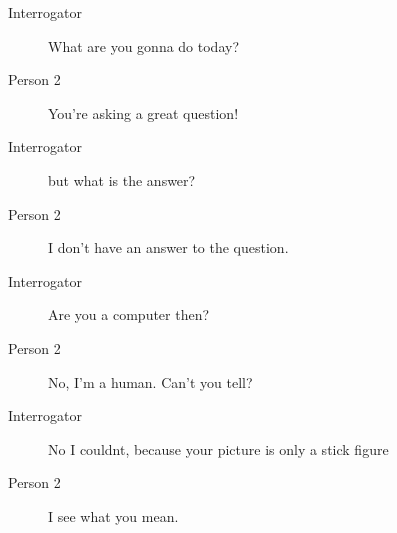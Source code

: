 \begin{itemize}
\begin{description}
\begin{description}
               \item [Interrogator] What are you gonna do today?
               \item [Person 2] You're asking a great question!
               \item [Interrogator] but what is the answer?
               \item [Person 2] I don't have an answer to the question.
               \item [Interrogator] Are you a computer then?
               \item [Person 2] No, I'm a human. Can't you tell?
               \item [Interrogator] No I couldnt, because your picture is only a stick figure
               \item [Person 2] I see what you mean.
            \end{description}


\end{description}
\end{itemize}
